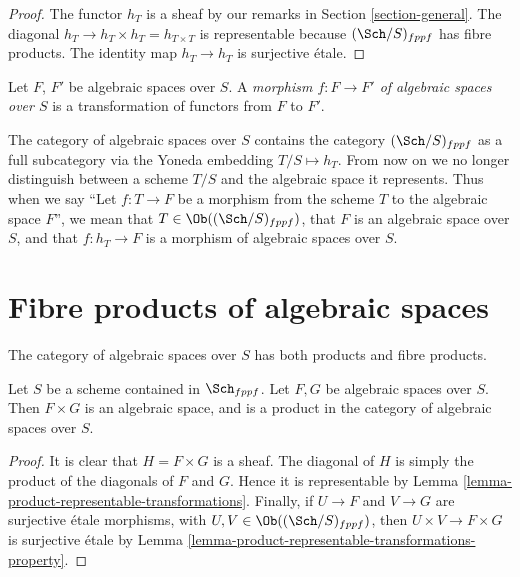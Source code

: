 \begin{proof}
The functor $h_T$ is a sheaf by our remarks in Section \ref{section-general}.
The diagonal $h_T \to h_T \times h_T = h_{T \times T}$ is
representable because $(\Sch/S)_{fppf}$ has fibre products.
The identity map $h_T \to h_T$ is surjective \'etale.
\end{proof}

\begin{definition}
\label{definition-morphism-algebraic-spaces}
Let $F$, $F'$ be algebraic spaces over $S$.
A {\it morphism $f : F \to F'$ of algebraic spaces over $S$}
is a transformation of functors from $F$ to $F'$.
\end{definition}

\noindent
The category of algebraic spaces over $S$ contains the category
$(\Sch/S)_{fppf}$ as a full subcategory via the
Yoneda embedding $T/S \mapsto h_T$. From now on we no longer distinguish
between a scheme $T/S$ and the algebraic space it represents.
Thus when we say ``Let $f : T \to F$ be a morphism from the scheme
$T$ to the algebraic space $F$'', we mean that
$T \in \Ob((\Sch/S)_{fppf})$, that $F$ is an
algebraic space over $S$, and that $f : h_T \to F$ is a morphism
of algebraic spaces over $S$.






\section{Fibre products of algebraic spaces}
\label{section-fibre-products}

\noindent
The category of algebraic spaces over $S$ has both products and
fibre products.

\begin{lemma}
\label{lemma-product-spaces}
Let $S$ be a scheme contained in $\Sch_{fppf}$.
Let $F, G$ be algebraic spaces over $S$.
Then $F \times G$ is an algebraic space, and is a product
in the category of algebraic spaces over $S$.
\end{lemma}

\begin{proof}
It is clear that $H = F \times G$ is a sheaf.
The diagonal of $H$ is simply the product of the
diagonals of $F$ and $G$. Hence it is representable by
Lemma \ref{lemma-product-representable-transformations}.
Finally, if $U \to F$ and $V \to G$ are surjective
\'etale morphisms, with $U, V \in \Ob((\Sch/S)_{fppf})$,
then $U \times V \to F \times G$ is surjective \'etale
by Lemma \ref{lemma-product-representable-transformations-property}.
\end{proof}

